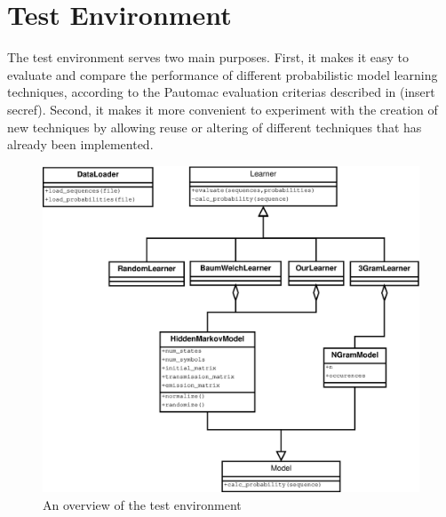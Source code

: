 \section{Test Environment}

The test environment serves two main purposes. First, it makes it easy to evaluate and compare the performance of different probabilistic model learning techniques, according to the Pautomac evaluation criterias described in (insert secref). Second, it makes it more convenient to experiment with the creation of new techniques by allowing reuse or altering of different techniques that has already been implemented.

\begin{figure}[!htb]
\centering
\includegraphics[scale=.4]{pictures/test-environment-overview.eps}
\caption{An overview of the test environment}
\label{fig:testenvironment}
\end{figure}

